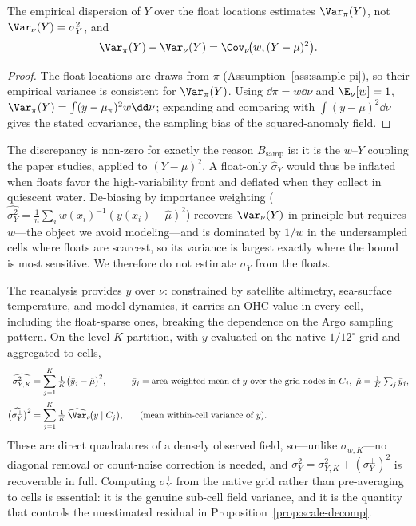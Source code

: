 \begin{proposition}
\label{prop:float-contam}
The empirical dispersion of $Y$ over the float locations estimates
$\Var_\pi(Y)$, not $\Var_\nu(Y)=\sigma_Y^2$, and
\[
  \Var_\pi(Y)-\Var_\nu(Y)=\Cov_\nu\!\big(w,(Y-\mu)^2\big).
\]
\end{proposition}

\begin{proof}
The float locations are draws from $\pi$ (Assumption~\ref{ass:sample-pi}),
so their empirical variance is consistent for $\Var_\pi(Y)$. Using
$\dd\pi=w\dd\nu$ and $\E_\nu[w]=1$,
$\Var_\pi(Y)=\int(y-\mu_\pi)^2 w\dd\nu$; expanding and comparing with
$\int(y-\mu)^2\dd\nu$ gives the stated covariance, the sampling bias of
the squared-anomaly field.
\end{proof}

The discrepancy is non-zero for exactly the reason $B_{\mathrm{samp}}$
is: it is the $w$--$Y$ coupling the paper studies, applied to
$(Y-\mu)^2$. A float-only $\hat\sigma_Y$ would thus be inflated when
floats favor the high-variability front and deflated when they collect
in quiescent water. De-biasing by importance weighting
($\widehat{\sigma_Y^2}=\frac1n\sum_i w(x_i)^{-1}(y(x_i)-\hat\mu)^2$)
recovers $\Var_\nu(Y)$ in principle but requires $w$---the object we
avoid modeling---and is dominated by $1/w$ in the undersampled cells
where floats are scarcest, so its variance is largest exactly where the
bound is most sensitive. We therefore do not estimate $\sigma_Y$ from
the floats.

The reanalysis provides $y$ over $\nu$: constrained by satellite
altimetry, sea-surface temperature, and model dynamics, it carries an
OHC value in every cell, including the float-sparse ones, breaking the
dependence on the Argo sampling pattern. On the level-$K$ partition,
with $y$ evaluated on the native $1/12^\circ$ grid and aggregated to
cells,
\begin{align}
  \widehat{\sigma_{Y,K}^2}
  &=\sum_{j=1}^{K}\tfrac1K\big(\bar y_j-\hat\mu\big)^2,
  &\bar y_j&=\text{area-weighted mean of $y$ over the grid nodes in }C_j,
  \ \hat\mu=\tfrac1K\textstyle\sum_j\bar y_j,
  \label{eq:sigmaYK-hat}\\[2pt]
  \big(\widehat{\sigma_Y^{\perp}}\big)^2
  &=\sum_{j=1}^{K}\tfrac1K\,\widehat{\Var}_\nu\!\big(y\mid C_j\big),
  &&\text{(mean within-cell variance of $y$).}
  \label{eq:sigmaYperp-hat}
\end{align}
These are direct quadratures of a densely observed field, so---unlike
$\sigma_{w,K}$---no diagonal removal or count-noise correction is
needed, and $\sigma_Y^2=\sigma_{Y,K}^2+(\sigma_Y^{\perp})^2$ is
recoverable in full. Computing $\sigma_Y^{\perp}$ from the native grid
rather than pre-averaging to cells is essential: it is the genuine
sub-cell field variance, and it is the quantity that controls the
unestimated residual in Proposition~\ref{prop:scale-decomp}.

